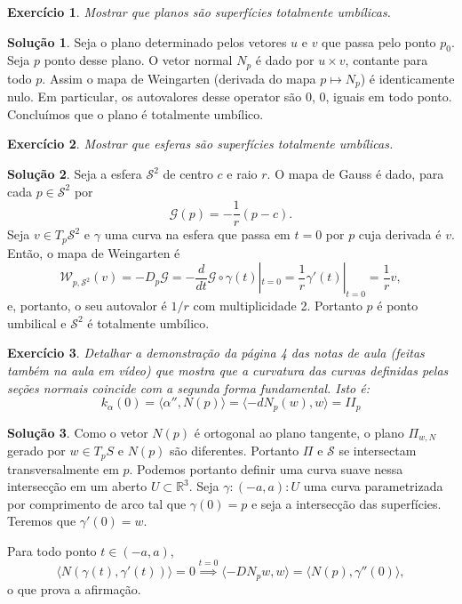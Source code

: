 \documentclass[a4paper,12pt]{article}
\newcommand{\R}{\mathbb{R}}
\newcommand{\sur}{\mathcal{S}}
\theoremstyle{exer}
\newtheorem{exercise}{Exercício}
\theoremstyle{definition}
\newtheorem{solution}{Solução}
\theoremstyle{plain}
\begin{document}
\begin{exercise}
    Mostrar que planos são superfícies totalmente umbílicas.
\end{exercise}

\begin{solution}
    Seja o plano determinado pelos vetores $u$ e $v$ que passa pelo ponto
    $p_0$. Seja $p$ ponto desse plano. O vetor normal $N_p$ é dado por $u \times v$,
    contante para todo $p$. Assim o mapa de Weingarten (derivada do mapa $p
    \mapsto N_p$) é identicamente nulo.
    Em particular, os autovalores desse operator são 0, 0, iguais em todo
    ponto. Concluímos que o plano é totalmente umbílico. 
    
\end{solution}

\begin{exercise}
    Mostrar que esferas são superfícies totalmente umbílicas.
\end{exercise}

\begin{solution}
    Seja a esfera $\sur^2$ de centro $c$ e raio $r$. O mapa de Gauss é dado,
    para cada $p\in\sur^2$
    por 
    $$
    \mathcal{G}(p) = -\frac{1}{r}(p - c).
    $$
    Seja $v \in T_p\sur^2$ e $\gamma$ uma curva na esfera que passa em $t=0$ por $p$
    cuja derivada é $v$. Então, o mapa de Weingarten é 
    $$
    \mathcal{W}_{p,\sur^2}(v) = -D_p \mathcal{G} = -\frac{d}{dt} \mathcal{G} \circ \gamma(t)|_{t=0} = \frac{1}{r}\gamma'(t)|_{t=0} = \frac{1}{r}v,  
    $$
    e, portanto, o seu autovalor é $1/r$ com multiplicidade 2. Portanto $p$ é
    ponto umbilical e $\sur^2$ é totalmente umbílico.
\end{solution}

\begin{exercise}
    Detalhar a demonstração da página 4 das notas de aula (feitas também na
    aula em vídeo) que mostra que a curvatura das curvas definidas pelas
    seções normais coincide com a segunda forma fundamental. Isto é:
    $$
    k_{\alpha}(0) = \langle \alpha'', N(p) \rangle = \langle - dN_p(w), w \rangle = II_p
    $$
\end{exercise}

\begin{solution}
    Como o vetor $N(p)$ é ortogonal ao plano tangente, o plano $\Pi_{w, N}$
    gerado por $w \in T_pS$ e $N(p)$ são diferentes. Portanto $\Pi$ e $\sur$
    se intersectam
    transversalmente em $p$. Podemos portanto definir uma curva suave nessa
    intersecção em um aberto $U \subset \R^3$. Seja $\gamma : (-a,a) : U$ uma
    curva parametrizada por comprimento de arco tal que $\gamma(0) = p$ e seja
    a intersecção das superfícies. Teremos que $\gamma '(0) = w$. 

    Para todo ponto $t \in (-a,a)$, 
    $$
    \langle N(\gamma(t), \gamma'(t)) \rangle = 0 \overset{t=0}{\implies} \langle -DN_pw, w\rangle = \langle N(p), \gamma ''(0)\rangle,
    $$
    o que prova a afirmação.
\end{solution}


\end{document}
